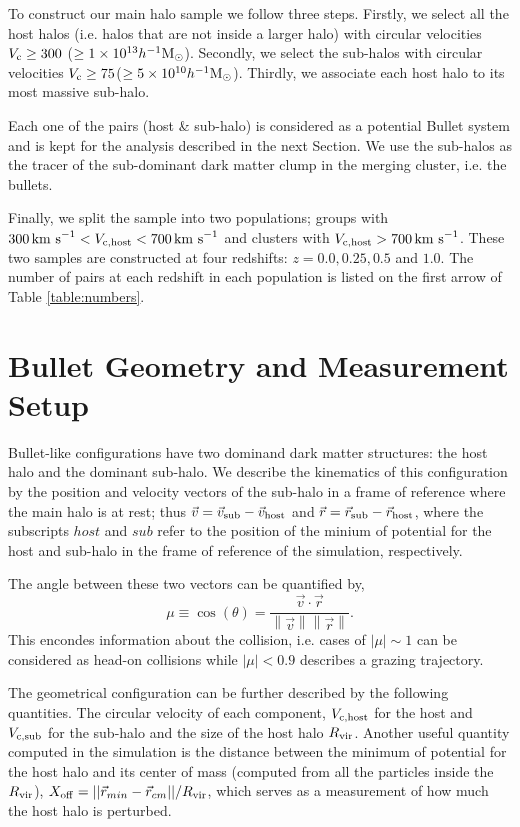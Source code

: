 \documentclass{emulateapj}
\newcommand{\hMsun}{{\ifmmode{h^{-1}{\rm {M_{\odot}}}}\else{$h^{-1}{\rm{M_{\odot}}}$}\fi}}
\newcommand{\kms}{{\ifmmode{{\mathrm{\,km\ s}^{-1}}}\else{\,km~s$^{-1}$}\fi}}
\begin{document}
To construct our main halo sample we follow three
steps. Firstly, we select all the host halos (i.e. halos that are not
inside a larger halo) with circular velocities $V_{\rm c}\geq 300$\kms
($\geq 1\times 10^{13} \hMsun$). Secondly, we select the sub-halos with
circular velocities $V_{\rm c}\geq 75$\kms ($\geq 5\times
10^{10}\hMsun$). Thirdly, we associate each host halo to its most
massive sub-halo. 


Each one of the pairs (host \& sub-halo) is considered as a
potential Bullet system and is kept for the analysis described in the
next Section. We use the sub-halos as the tracer of the sub-dominant
dark matter clump in the merging cluster, i.e. the bullets.  


Finally, we split the sample into two  populations; groups with
$300\kms < V_{\rm c, host}<700\kms$ and clusters with $V_{\rm
  c,host}>700\kms$. These two samples are constructed at four redshifts:
$z=0.0, 0.25, 0.5$ and $1.0$.  The number of pairs at each redshift in
each population is listed on the first arrow of Table
\ref{table:numbers}. 



\section{Bullet Geometry and Measurement Setup}
\label{sec:setup}

Bullet-like configurations have two dominand dark matter structures:
the host halo and the dominant sub-halo. We describe the kinematics of this configuration by the 
position and velocity vectors of the sub-halo in a frame of reference
where the main halo is at rest; thus
$\vec{v{}}=\vec{v}_{\rm sub}-\vec{v}_{\rm host}$ and
$\vec{r{}}=\vec{r}_{\rm sub}-\vec{r}_{\rm host}$, where the subscripts $host$
and $sub$ refer to the position of the minium of potential for the
host and sub-halo in the frame of reference of the simulation, respectively.  

The angle between these two vectors can be quantified by, 
\begin{equation}
  \mu\equiv
  \cos(\theta)=\frac{\vec{v{}}\cdotp{}\vec{r}}{\left\|\vec{v}{}\right\|
    \left\|\vec{r}\right\|} .
 \end{equation} 
%
This encondes information about the collision, i.e. cases of
$|\mu|\sim 1$ can be considered as head-on collisions while
$|\mu|< 0.9$ describes a grazing trajectory.  

The geometrical configuration can be further described by the
following quantities. The circular velocity of each component, $V_{\rm
  c,host}$ for the host and $V_{\rm c, sub}$ for the sub-halo and the
size of the host halo $R_{\rm vir}$. Another useful quantity computed
in the simulation is the distance between the minimum of potential for
the host halo and its center of mass (computed from all the particles
inside the $R_{\rm vir}$), $X_{\rm off}=||\vec{r}_{min}-\vec{r}_{cm}||/R_{\rm vir}$, which serves as a
measurement of how much the host halo is perturbed. 
\end{document}
